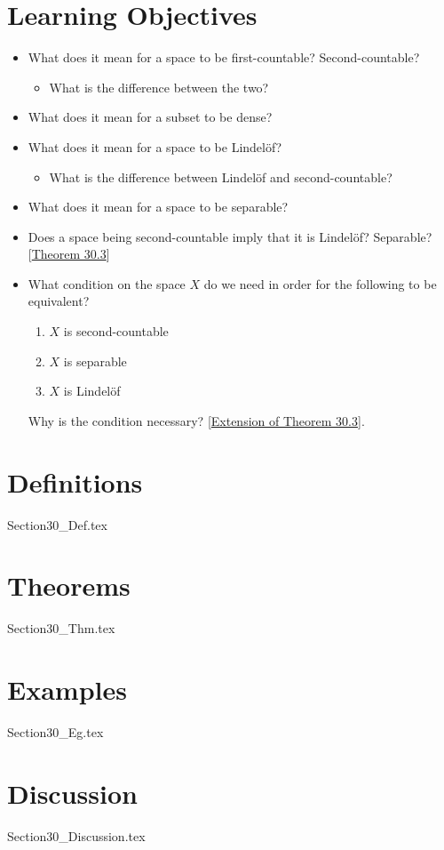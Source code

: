 \section{Learning Objectives}

\begin{itemize}
    \item What does it mean for a space to be first-countable?
        Second-countable?
        \begin{itemize}
            \item What is the difference between the two?
        \end{itemize}
    \item What does it mean for a subset to be dense?
    \item What does it mean for a space to be Lindel\"{o}f?
        \begin{itemize}
            \item What is the difference between Lindel\"{o}f and second-countable?
        \end{itemize}
    \item What does it mean for a space to be separable?
    \item Does a space being second-countable imply that it is Lindel\"{o}f?
        Separable?
        [\hyperlink{thm:30.3}{Theorem 30.3}]
    \item What condition on the space \( X \) do we need in order for the following 
        to be equivalent?
        \begin{enumerate}
            \item \( X \) is second-countable
            \item \( X \) is separable
            \item \( X \) is Lindel\"{o}f
        \end{enumerate}
        Why is the condition necessary? 
        [\hyperlink{thm:30.4}{Extension of Theorem 30.3}].
\end{itemize}

\section{Definitions}

{Section30_Def.tex}

\section{Theorems}

{Section30_Thm.tex}

\section{Examples}

{Section30_Eg.tex}

\section{Discussion}

{Section30_Discussion.tex}